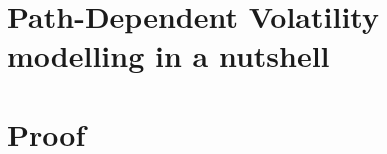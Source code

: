 \documentclass[a4paper,12pt, openright]{report}
\numberwithin{equation}{section}
\numberwithin{equation}{section}
\newcommand{\1}{\mathbbm{1}}
\theoremstyle{mystyle}
\renewcommand{\footrulewidth}{0pt}
\begin{document}
\newpage

\newpage

\chapter{Path-Dependent Volatility modelling in a nutshell}
\pagestyle{fancyplain}
\renewcommand{\headrulewidth}{1pt}
\renewcommand{\footrulewidth}{1pt}
\fancyhf{}

\fancyhead[L]{\fontsize{9}{12} \selectfont \rightmark}
\cfoot{\thepage}
\renewcommand{\subsectionmark}[1]{%
  \markright{\MakeUppercase{\thesubsection.\ #1}}}%








\appendix
\chapter{Proof}\label{appendix:sa}



   
\pagestyle{fancy}
\fancyhf{}
\cfoot{\thepage}
\end{document}

